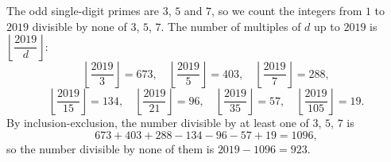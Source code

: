 The odd single-digit primes are $3$, $5$ and $7$, so we count the integers from $1$ to $2019$ divisible by none of $3$, $5$, $7$. The number of multiples of $d$ up to $2019$ is $\left\lfloor\dfrac{2019}{d}\right\rfloor$:
\[\left\lfloor\dfrac{2019}{3}\right\rfloor=673,\quad \left\lfloor\dfrac{2019}{5}\right\rfloor=403,\quad \left\lfloor\dfrac{2019}{7}\right\rfloor=288,\]
\[\left\lfloor\dfrac{2019}{15}\right\rfloor=134,\quad \left\lfloor\dfrac{2019}{21}\right\rfloor=96,\quad \left\lfloor\dfrac{2019}{35}\right\rfloor=57,\quad \left\lfloor\dfrac{2019}{105}\right\rfloor=19 .\]
By inclusion-exclusion, the number divisible by at least one of $3$, $5$, $7$ is
\[673+403+288-134-96-57+19=1096,\]
so the number divisible by none of them is $2019-1096=\boxed{923}$.
